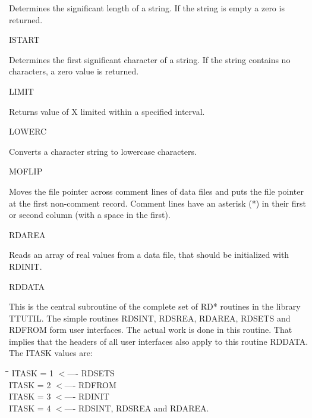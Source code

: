 \begin{indenting}{2.54cm}
Determines the significant length of a string. If the string is empty a zero is
returned.
\end{indenting}
ISTART
\testlastline

\begin{indenting}{2.54cm}
Determines the first significant character of a string. If the string cont\-ains
no characters, a zero value is returned.
\end{indenting}
LIMIT
\testlastline

\begin{indenting}{2.54cm}
Returns value of X limited within a specified interval.
\end{indenting}
LOWERC
\testlastline

\begin{indenting}{2.54cm}
Converts a character string to lowercase characters.
\end{indenting}
MOFLIP
\testlastline

\begin{indenting}{2.54cm}
Moves the file pointer across comment lines of data files and puts the file
pointer at the first non-comment record. Comment lines have an asterisk
(*) in their first or second column (with a space in the first).\hfill  
\end{indenting}
RDAREA
\testlastline

\begin{indenting}{2.54cm}
Reads an array of real values from a data file, that should be initialized
with RDINIT.
\end{indenting}
RDDATA
\testlastline

\begin{indenting}{2.54cm}
This is the central subroutine of the complete set of RD* routines in the
library TTUTIL. The simple routines RDSINT, RDSREA, RDAR\-EA,
RDSETS and RDFROM form user interfaces. The actual work is done in
this routine. That implies that the headers of all user interfaces also apply
to this routine RDDATA. The ITASK values are:
\end{indenting}
\begin{tabbing}
\hspace{1.27cm}\=\hspace{1.27cm}\=\hspace{1.27cm}\=\hspace{1.27cm}\=%
\hspace{1.27cm}\=\hspace{1.27cm}\=\hspace{1.27cm}\=\hspace{1.27cm}\=%
\hspace{1.27cm}\=\hspace{1.27cm}\=\kill
\>\> ITASK = 1 $<$---- RDSETS\\
\>\> ITASK = 2 $<$---- RDFROM\\
\>\> ITASK = 3 $<$---- RDINIT\\
\>\> ITASK = 4 $<$---- RDSINT, RDSREA and RDAREA.
\end{tabbing}

